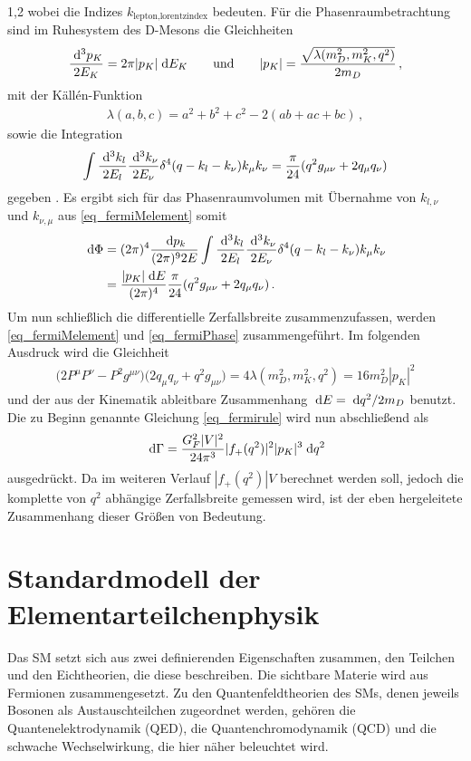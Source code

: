 \documentclass[11pt,a4paper,twoside]{report}
\begin{document}
\begin{spacing}{1,2}
wobei die Indizes $k_{\text{lepton},\text{lorentzindex}}$ bedeuten. Für die Phasenraumbetrachtung sind im Ruhesystem des D-Mesons die Gleichheiten
\begin{align}
 \frac{\; \mathrm{d}^3 p_K}{2E_K} = 2\pi |p_K| \; \mathrm{d} E_K \qquad \text{und} \qquad |p_K| = \frac{\sqrt{\lambda(m_D^2,m_K^2,q^2)}}{2m_D}\,,
\end{align}
mit der Källén-Funktion
\begin{align}
 \lambda(a,b,c) = a^2 + b^2 + c^2 - 2(ab + ac + bc)\,,
\end{align}
sowie die Integration
\begin{align}
 \int \frac{\; \mathrm{d}^3k_l}{2E_l}\frac{\; \mathrm{d}^3k_\nu}{2E_\nu}\delta^4(q-k_l-k_\nu)k_\mu k_\nu = \frac{\pi}{24}(q^2 g_{\mu\nu} + 2 q_\mu q_\nu)
\end{align}
gegeben \cite{Griffiths}. Es ergibt sich für das Phasenraumvolumen mit Übernahme von $k_{l,\nu}$ und $k_{\nu,\mu}$ aus \eqref{eq_fermiMelement} somit
\begin{align}
 \; \mathrm{d} \Phi &= (2\pi)^4 \frac{\; \mathrm{d} p_k}{(2\pi)^9 2E} \int \frac{\; \mathrm{d}^3k_l}{2E_l}\frac{\; \mathrm{d}^3k_\nu}{2E_\nu}\delta^4(q-k_l-k_\nu)k_\mu k_\nu \nonumber\\
 &= \frac{|p_K| \; \mathrm{d} E}{(2\pi)^4}\frac{\pi}{24}(q^2g_{\mu\nu} + 2 q_\mu q_\nu)\,.
 \label{eq_fermiPhase}
\end{align}
Um nun schließlich die differentielle Zerfallsbreite zusammenzufassen, werden \eqref{eq_fermiMelement} und \eqref{eq_fermiPhase} zusammengeführt. Im
folgenden Ausdruck wird die Gleichheit
\begin{align}
 \big(2P^\mu P^\nu - P^2 g^{\mu\nu}\big)\big(2q_\mu q_\nu + q^2g_{\mu\nu}) = 4 \lambda(m_D^2,m_K^2,q^2) = 16 m_D^2 |p_K|^2
\end{align}
und der aus der Kinematik ableitbare Zusammenhang $\; \mathrm{d} E = \; \mathrm{d} q^2 / 2m_D$ benutzt. Die zu Beginn genannte Gleichung \eqref{eq_fermirule} wird 
nun abschließend als
\begin{align}
 \; \mathrm{d} \Gamma = \frac{G_F^2|V|^2}{24\pi^3} |f_+(q^2)|^2 |p_K|^3 \; \mathrm{d} q^2
 \label{eq_fermidGammafinal}
\end{align}
ausgedrückt. Da im weiteren Verlauf $|f_+(q^2)|V$ berechnet werden soll, jedoch die komplette von $q^2$ abhängige Zerfallsbreite gemessen wird, ist der eben hergeleitete
Zusammenhang dieser Größen von Bedeutung.

\section{Standardmodell der Elementarteilchenphysik}
Das SM setzt sich aus zwei definierenden Eigenschaften zusammen, den Teilchen und den Eichtheorien, die diese beschreiben. Die sichtbare Materie wird 
aus Fermionen zusammengesetzt. Zu den Quantenfeldtheorien des SMs, denen jeweils Bosonen als Austauschteilchen zugeordnet werden, gehören die 
Quantenelektrodynamik (QED), die Quantenchromodynamik (QCD) und die schwache Wechselwirkung, die hier näher beleuchtet wird. 


\end{spacing}
\end{document}
